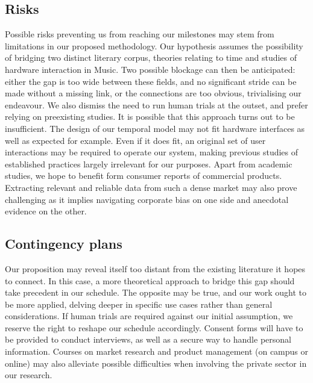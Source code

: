 \documentclass[journal,onecolumn]{IEEEtran}
\begin{document}
\subsection{Risks}
Possible risks preventing us from reaching our milestones may stem from limitations in our proposed methodology. Our hypothesis assumes the possibility of bridging two distinct literary corpus, theories relating to time and studies of hardware interaction in Music. Two possible blockage can then be anticipated: either the gap is too wide between these fields, and no significant stride can be made without a missing link, or the connections are too obvious, trivialising our endeavour. We also dismiss the need to run human trials at the outset, and prefer relying on preexisting studies. It is possible that this approach turns out to be insufficient. The design of our temporal model may not fit hardware interfaces as well as expected for example. Even if it does fit, an original set of user interactions may be required to operate our system, making previous studies of established practices largely irrelevant for our purposes. Apart from academic studies, we hope to benefit form consumer reports of commercial products. Extracting relevant and reliable data from such a dense market may also prove challenging as it implies navigating corporate bias on one side and anecdotal evidence on the other.

\subsection{Contingency plans}
Our proposition may reveal itself too distant from the existing literature it hopes to connect. In this case, a more theoretical approach to bridge this gap should take precedent in our schedule. The opposite may be true, and our work ought to be more applied, delving deeper in specific use cases rather than general considerations. If human trials are required against our initial assumption, we reserve the right to reshape our schedule accordingly. Consent forms will have to be provided to conduct interviews, as well as a secure way to handle personal information. Courses on market research and product management (on campus or online) may also alleviate possible difficulties when involving the private sector in our research.
\end{document}
